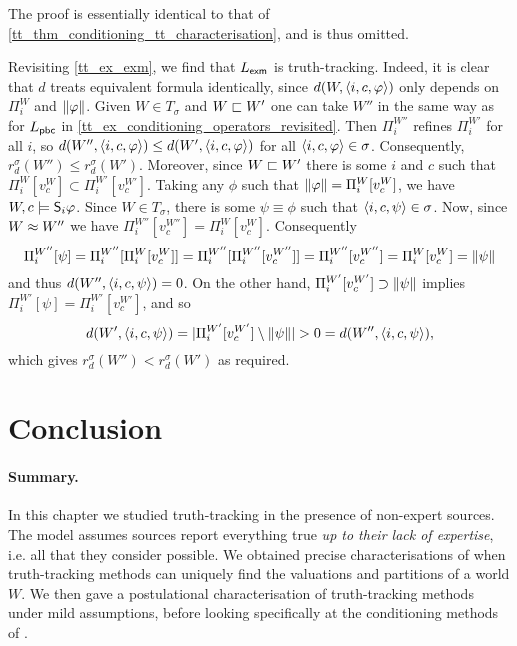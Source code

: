 The proof is essentially identical to that of
\cref{tt_thm_conditioning_tt_characterisation}, and is thus omitted.

\begin{example}
    Revisiting \cref{tt_ex_exm}, we find that $L_\exm$ is truth-tracking.
    Indeed, it is clear that $d$ treats equivalent formula identically, since
    $d(W, \tuple{i, c, \phi})$ only depends on $\Pi^W_i$ and $\propmods{\phi}$.
    Given $W \in T_\sigma$ and $W \speclt W'$ one can take $W''$ in the
    same way as for $L_\pbc$ in
    \cref{tt_ex_conditioning_operators_revisited}. Then $\Pi^{W''}_i$ refines
    $\Pi^{W'}_i$ for all $i$, so $d(W'', \tuple{i, c, \phi}) \le d(W',
    \tuple{i, c, \phi})$ for all $\tuple{i, c, \phi} \in \sigma$. Consequently,
    $r_d^\sigma(W'') \le r_d^\sigma(W')$. Moreover, since $W \speclt W'$
    there is some $i$ and $c$ such that $\Pi^{W}_i[v^{W}_c]
    \subset \Pi^{W'}_i[v^{W'}_c]$. Taking any $\phi$ such that $\propmods{\phi}
    = \Pi^{W}_i[v^{W}_c]$, we have $W, c \models \S_i\phi$. Since $W \in
    T_\sigma$, there is some $\psi \equiv \phi$ such that $\tuple{i, c, \psi}
    \in \sigma$. Now, since $W \speceq W''$ we have $\Pi^{W''}_i[v^{W''}_c] =
    \Pi^{W}_i[v^W_c]$. Consequently
    \[
        \Pi^{W''}_i[\psi]
        = \Pi^{W''}_i[\Pi^W_i[v^W_c]]
        = \Pi^{W''}_i[\Pi^{W''}_i[v^{W''}_c]]
        = \Pi^{W''}_i[v^{W''}_c]
        = \Pi^W_i[v^W_c]
        = \propmods{\psi}
    \]
    and thus $d(W'', \tuple{i, c, \psi})= 0$. On the other hand,
    $\Pi^{W'}_i[v^{W'}_c] \supset \propmods{\psi}$ implies $\Pi^{W'}_i[\psi] =
    \Pi^{W'}_i[v^{W'}_c]$, and so
    \[
        d(W', \tuple{i, c, \psi})
        = |\Pi^{W'}_i[v^{W'}_c] \setminus \propmods{\psi}|
        > 0 = d(W'', \tuple{i, c, \psi}),
    \]
    which gives $r_d^\sigma(W'') < r_d^\sigma(W')$ as required.
\end{example}

\section{Conclusion}
\label{tt_sec_conclusion}

\paragraph{Summary.}

In this chapter we studied truth-tracking in the presence of non-expert sources.
The model assumes sources report everything true \emph{up to their lack of
expertise}, i.e. all that they consider possible. We obtained precise
characterisations of when truth-tracking methods can uniquely find the
valuations and partitions of a world $W$. We then gave a postulational
characterisation of truth-tracking methods under mild assumptions, before looking
specifically at the conditioning methods of
\textcite{singleton_booth_22_preprint}.

